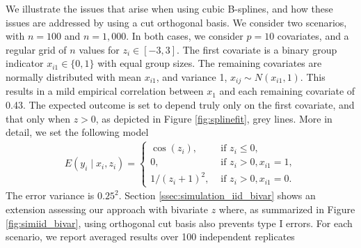 We illustrate the issues that arise when using cubic B-splines, and how these issues are addressed by using a cut orthogonal basis. 
We consider two scenarios, with $n=100$ and $n=1,000$.  In both cases, we consider $p=10$ covariates, and a regular grid of $n$ values for $z_i \in [-3,3]$. The first covariate is a binary group indicator $x_{i1} \in \{0,1\}$ with equal group sizes. The remaining covariates are normally distributed with mean $x_{i1}$, and variance 1,  $x_{ij} \sim N(x_{i1},1)$. This results in  a mild empirical correlation between $x_1$ and each remaining covariate of 0.43. 
The expected outcome is set to depend truly only on the first covariate, and that only when $z>0$, as depicted in Figure \ref{fig:splinefit}, grey lines.
More in detail, we set the following model 
\begin{align}
 E(y_i \mid x_i, z_i)= 
\begin{cases}
\cos(z_i), &\mbox{ if } z_i \leq 0, \\
0,   &\mbox{ if } z_i>0, x_{i1}=1, \\
1/(z_i+1)^2, &\mbox{ if } z_i>0, x_{i1}=0.
\end{cases}
\nonumber
\end{align}
 The error variance is $0.25^2$. 
Section \ref{ssec:simulation_iid_bivar} shows an extension assessing our approach with bivariate $z$ where, as summarized in Figure \ref{fig:simiid_bivar}, using orthogonal cut basis also prevents type I errors.
For each scenario, we report averaged results over 100 independent replicates 



